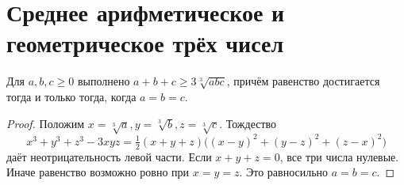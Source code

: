 
\section*{Среднее арифметическое и геометрическое трёх чисел}
\begin{theorem}
Для \(a,b,c\ge0\) выполнено \(a+b+c\ge3\sqrt[3]{abc}\), причём равенство достигается тогда и только тогда, когда \(a=b=c\).
\end{theorem}
\begin{proof}Положим \(x=\sqrt[3]a,y=\sqrt[3]b,z=\sqrt[3]c\). Тождество
\[
x^3+y^3+z^3-3xyz=\tfrac12(x+y+z)\bigl((x-y)^2+(y-z)^2+(z-x)^2\bigr)
\]
даёт неотрицательность левой части. Если \(x+y+z=0\), все три числа нулевые. Иначе равенство возможно ровно при \(x=y=z\). Это равносильно \(a=b=c\).\end{proof}
